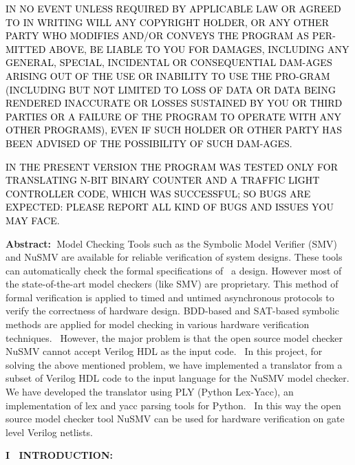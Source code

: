 \documentclass[a4paper]{article}
\begin{document}
\bigskip

{\color[rgb]{0.0,0.0,0.039215688}
\textcolor{black}{IN NO EVENT UNLESS REQUIRED BY APPLICABLE LAW OR
AGREED TO IN WRITING WILL ANY COPYRIGHT HOLDER, OR ANY OTHER PARTY WHO
MODIFIES AND/OR CONVEYS THE PROGRAM AS PER-MITTED ABOVE, BE LIABLE TO
YOU FOR DAMAGES, INCLUDING ANY GENERAL, SPECIAL, INCIDENTAL OR
CONSEQUENTIAL DAM-AGES ARISING OUT OF THE USE OR INABILITY TO USE THE
PRO-GRAM (INCLUDING BUT NOT LIMITED TO LOSS OF DATA OR DATA BEING
RENDERED INACCURATE OR LOSSES SUSTAINED BY YOU OR THIRD PARTIES OR A
FAILURE OF THE PROGRAM TO OPERATE WITH ANY OTHER PROGRAMS), EVEN IF
SUCH HOLDER OR OTHER PARTY HAS BEEN ADVISED OF THE POSSIBILITY OF SUCH
DAM-AGES.}}


\bigskip


\bigskip

{\color[rgb]{0.0,0.0,0.039215688}
\textcolor{black}{IN THE PRESENT VERSION THE PROGRAM WAS TESTED ONLY FOR
TRANSLATING N-BIT BINARY COUNTER AND A TRAFFIC LIGHT CONTROLLER CODE,
WHICH WAS SUCCESSFUL; SO BUGS ARE EXPECTED: PLEASE REPORT ALL KIND OF
BUGS AND ISSUES YOU MAY FACE.\ }}

\clearpage\clearpage\setcounter{page}{1}\pagestyle{MPi}
\thispagestyle{MPFi}
{\color[rgb]{0.0,0.0,0.039215688}
\textrm{\textbf{Abstract:\ }}\textrm{Model Checking Tools such as the
Symbolic Model Verifier (SMV) and NuSMV are available for reliable
verification of system designs. These tools can automatically check the
formal specifications of \ a design. However most of the
state-of-the-art model checkers (like SMV) are proprietary. This method
of formal verification is applied to timed and untimed asynchronous
protocols to verify the correctness of hardware design. BDD-based and
SAT-based symbolic methods are applied for model checking in various
hardware verification techniques. \ However, the major problem is that
the open source model checker NuSMV cannot accept Verilog HDL as the
input code. \ In this project, for solving the above mentioned problem,
we have implemented a translator from a subset of Verilog HDL code to
the input language for the NuSMV model checker. We have developed the
translator using PLY (Python Lex-Yacc), an implementation of lex and
yacc parsing tools for Python. \ In this way the open source model
checker tool NuSMV can be used for hardware verification on gate level
Verilog netlists.\ }}


\bigskip

{\color[rgb]{0.0,0.0,0.039215688}
\textrm{\textbf{I \ INTRODUCTION:}}}
\end{document}
